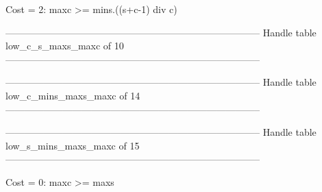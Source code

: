 Cost =  2:  maxc >= mins.((s+c-1) div c)

--------------------------------------------------------------------------------
Handle table low_c_s_maxs_maxc of 10
--------------------------------------------------------------------------------


--------------------------------------------------------------------------------
Handle table low_c_mins_maxs_maxc of 14
--------------------------------------------------------------------------------


--------------------------------------------------------------------------------
Handle table low_s_mins_maxs_maxc of 15
--------------------------------------------------------------------------------

Cost =  0:  maxc >= maxs


